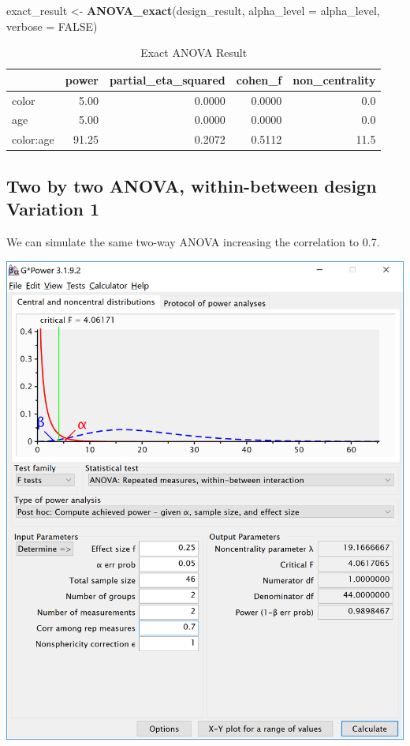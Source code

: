 \documentclass[]{book}
\newenvironment{Shaded}{\begin{snugshade}}{\end{snugshade}}
\newcommand{\DataTypeTok}[1]{\textcolor[rgb]{0.13,0.29,0.53}{#1}}
\newcommand{\KeywordTok}[1]{\textcolor[rgb]{0.13,0.29,0.53}{\textbf{#1}}}
\newcommand{\NormalTok}[1]{#1}
\newcommand{\OtherTok}[1]{\textcolor[rgb]{0.56,0.35,0.01}{#1}}
\newcommand{\StringTok}[1]{\textcolor[rgb]{0.31,0.60,0.02}{#1}}
\begin{document}
\begin{Shaded}
\begin{Highlighting}[]
\NormalTok{exact_result <-}\StringTok{ }\KeywordTok{ANOVA_exact}\NormalTok{(design_result,}
                            \DataTypeTok{alpha_level =}\NormalTok{ alpha_level,}
                            \DataTypeTok{verbose =} \OtherTok{FALSE}\NormalTok{)}
\end{Highlighting}
\end{Shaded}

\begin{table}[!h]

\caption{\label{tab:unnamed-chunk-174}Exact ANOVA Result}
\centering
\begin{tabular}{l|r|r|r|r}
\hline
  & power & partial\_eta\_squared & cohen\_f & non\_centrality\\
\hline
color & 5.00 & 0.0000 & 0.0000 & 0.0\\
\hline
age & 5.00 & 0.0000 & 0.0000 & 0.0\\
\hline
color:age & 91.25 & 0.2072 & 0.5112 & 11.5\\
\hline
\end{tabular}
\end{table}

\hypertarget{two-by-two-anova-within-between-design-variation-1}{%
\subsection{Two by two ANOVA, within-between design Variation 1}\label{two-by-two-anova-within-between-design-variation-1}}

We can simulate the same two-way ANOVA increasing the correlation to 0.7.

\includegraphics{screenshots/gpower_6.png}
\end{document}
